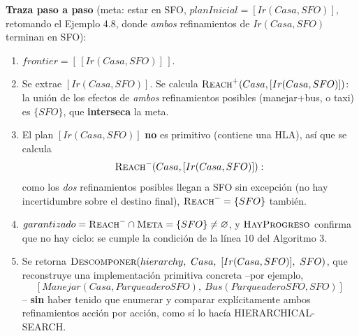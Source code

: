 \textbf{Traza paso a paso} (meta: estar en SFO, $planInicial=[Ir(Casa,SFO)]$, retomando el
Ejemplo 4.8, donde \emph{ambos} refinamientos de $Ir(Casa,SFO)$ terminan en SFO):
\begin{enumerate}
    \item $frontier = [\,[Ir(Casa,SFO)]\,]$.
    \item Se extrae $[Ir(Casa,SFO)]$. Se calcula $\textsc{Reach}^+(Casa,[Ir(Casa,SFO)])$: la unión
    de los efectos de \emph{ambos} refinamientos posibles (manejar+bus, o taxi) es $\{SFO\}$, que
    \textbf{interseca} la meta.
    \item El plan $[Ir(Casa,SFO)]$ \textbf{no} es primitivo (contiene una HLA), así que se calcula
    \[
        \textsc{Reach}^-(Casa,[Ir(Casa,SFO)]):
    \]
    como los \emph{dos} refinamientos posibles llegan a SFO sin excepción (no hay incertidumbre
    sobre el destino final), $\textsc{Reach}^- = \{SFO\}$ también.
    \item $garantizado = \textsc{Reach}^-\cap\textsc{Meta} = \{SFO\}\neq\varnothing$, y
    $\textsc{HayProgreso}$ confirma que no hay ciclo: se cumple la condición de la línea 10 del
    Algoritmo 3.
    \item Se retorna $\Call{Descomponer}{hierarchy,\ Casa,\ [Ir(Casa,SFO)],\ SFO}$, que reconstruye
    una implementación primitiva concreta --por ejemplo,
    \[
        [Manejar(Casa,ParqueaderoSFO),\ Bus(ParqueaderoSFO,SFO)]
    \]
    -- \textbf{sin} haber tenido que enumerar y comparar explícitamente ambos refinamientos
    acción por acción, como sí lo hacía
    HIERARCHICAL-SEARCH.
\end{enumerate}

